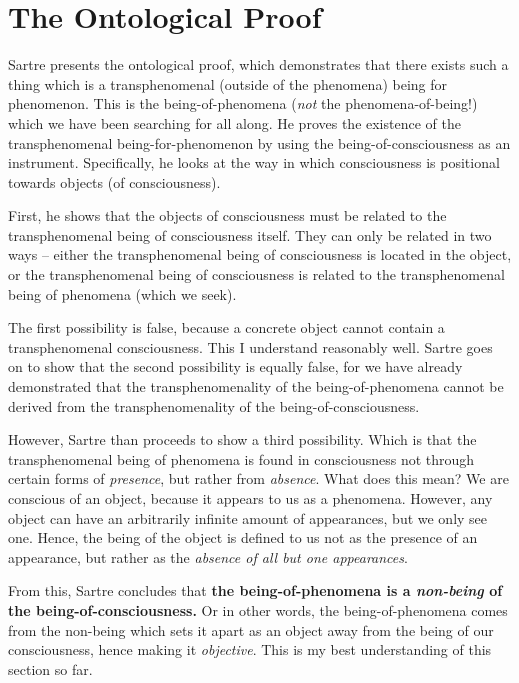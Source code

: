 \section{The Ontological Proof}

Sartre presents the ontological proof, which demonstrates that there exists such a thing which is a transphenomenal (outside of the phenomena) being for phenomenon. This is the being-of-phenomena (\emph{not} the phenomena-of-being!) which we have been searching for all along. He proves the existence of the transphenomenal being-for-phenomenon by using the being-of-consciousness as an instrument. Specifically, he looks at the way in which consciousness is positional towards objects (of consciousness).

First, he shows that the objects of consciousness must be related to the transphenomenal being of consciousness itself. They can only be related in two ways -- either the transphenomenal being of consciousness is located in the object, or the transphenomenal being of consciousness is related to the transphenomenal being of phenomena (which we seek).

The first possibility is false, because a concrete object cannot contain a transphenomenal consciousness. This I understand reasonably well. Sartre goes on to show that the second possibility is equally false, for we have already demonstrated that the transphenomenality of the being-of-phenomena cannot be derived from the transphenomenality of the being-of-consciousness.

However, Sartre than proceeds to show a third possibility. Which is that the transphenomenal being of phenomena is found in consciousness not through certain forms of \emph{presence}, but rather from \emph{absence}. What does this mean? We are conscious of an object, because it appears to us as a phenomena. However, any object can have an arbitrarily infinite amount of appearances, but we only see one. Hence, the being of the object is defined to us not as the presence of an appearance, but rather as the \emph{absence of all but one appearances}.

From this, Sartre concludes that \textbf{the being-of-phenomena is a \emph{non-being} of the being-of-consciousness.} Or in other words, the being-of-phenomena comes from the non-being which sets it apart as an object away from the being of our consciousness, hence making it \emph{objective}. This is my best understanding of this section so far.

